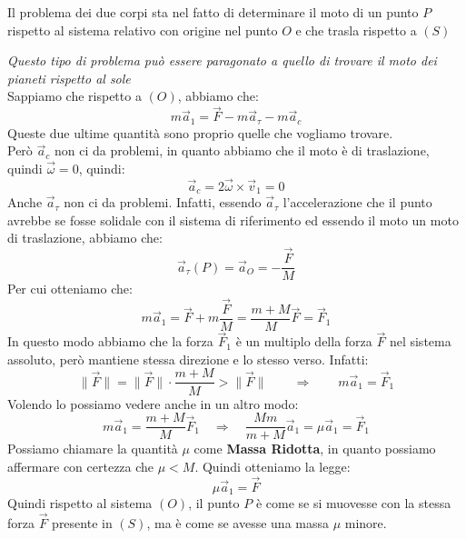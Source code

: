\documentclass[11pt,a4paper,twoside]{article}
\theoremstyle{definition}
\begin{document}
Il problema dei due corpi sta nel fatto di determinare il moto di un punto $P$ rispetto al sistema relativo con origine nel punto $O$ e che trasla rispetto a $(S)$

\begin{center}
\end{center}
\textit{Questo tipo di problema può essere paragonato a quello di trovare il moto dei pianeti rispetto al sole}\\
Sappiamo che rispetto a $(O)$, abbiamo che:
\[ m \vec a_1 = \vec F - m\vec a_\tau - m\vec a_c \]
Queste due ultime quantità sono proprio quelle che vogliamo trovare.\\
Però $\vec a_c$ non ci da problemi, in quanto abbiamo che il moto è di traslazione, quindi $\vec \omega = 0$, quindi:
\[ \vec a_c = 2 \vec \omega \times \vec v_1 = 0 \]
Anche $\vec a_\tau$ non ci da problemi. Infatti, essendo $\vec a_\tau$ l'accelerazione che il punto avrebbe se fosse solidale con il sistema di riferimento ed essendo il moto un moto di traslazione, abbiamo che:
\[ \vec a_\tau (P) = \vec a_O = -\frac {\vec F}M \]
Per cui otteniamo che:
\[ m\vec a_1 = \vec F + m \frac{\vec F}M = \frac{m+M}M \vec F= \vec F_1 \]
In questo modo abbiamo che la forza $\vec F_1$ è un multiplo della forza $\vec F$ nel sistema assoluto, però mantiene stessa direzione e lo stesso verso. Infatti:
\[ \|\vec F\| = \|\vec F\|\cdot \frac{m+M}M > \|\vec F\| \qquad \Rightarrow \qquad m\vec a_1 = \vec F_1\]
Volendo lo possiamo vedere anche in un altro modo:
\[ m\vec a_1 = \frac{m+M}M \vec F_1 \quad \Rightarrow \quad \frac{Mm}{m+M}\vec a_1 = \mu \vec a_1 = \vec F_1 \]
Possiamo chiamare la quantità $\mu$ come \textbf{Massa Ridotta}, in quanto possiamo affermare con certezza che $\mu<M$. Quindi otteniamo la legge:
\[ \mu \vec a_1 = \vec F \]
Quindi rispetto al sistema $(O)$, il punto $P$ è come se si muovesse con la stessa forza $\vec F$ presente in $(S)$, ma è come se avesse una massa $\mu$ minore.
\end{document}
